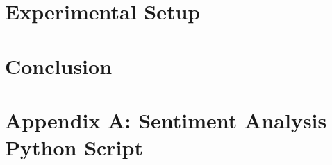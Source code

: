 \documentclass[oneside,12pt,bibliography=totoc]{scrbook}
\begin{document}
\chapter{Experimental Setup}
    

\chapter{Conclusion}
    
    

\backmatter
        
\printbibliography[title={References}]

\appendix
\chapter{Appendix A: Sentiment Analysis Python Script}


% 
\end{document}
